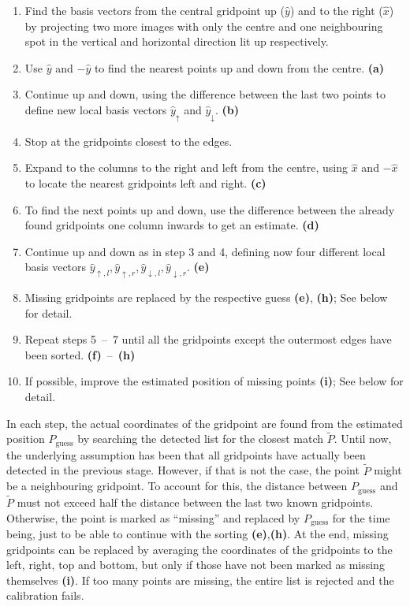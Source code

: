 \begin{enumerate}
    \item Find the basis vectors from the central gridpoint up ($\hat{y}$) and to the right ($\hat{x}$) by projecting two more images with only the centre and one neighbouring spot in the vertical and horizontal direction lit up respectively. 
    \item Use $\hat{y}$ and $-\hat{y}$ to find the nearest points up and down from the centre. \textbf{(a)}
    \item Continue up and down, using the difference between the last two points to define new local basis vectors $\hat{y}_\uparrow$ and $\hat{y}_\downarrow$. \textbf{(b)}
    \item Stop at the gridpoints closest to the edges.
    \item Expand to the columns to the right and left from the centre, using $\hat{x}$ and $-\hat{x}$ to locate the nearest gridpoints left and right. \textbf{(c)}
    \item To find the next points up and down, use the difference between the already found gridpoints one column inwards to get an estimate. \textbf{(d)}
    \item Continue up and down as in step 3 and 4, defining now four different local basis vectors $\hat{y}_{\uparrow,l}, \hat{y}_{\uparrow,r}, \hat{y}_{\downarrow,l}, \hat{y}_{\downarrow,r}$. \textbf{(e)}
    \item Missing gridpoints are replaced by the respective guess \textbf{(e)}, \textbf{(h)}; See below for detail.
    \item Repeat steps 5~--~7 until all the gridpoints except the outermost edges have been sorted. \textbf{(f)}~--~\textbf{(h)}
    \item If possible, improve the estimated position of missing points \textbf{(i)}; See below for detail.
\end{enumerate}
In each step, the actual coordinates of the gridpoint are found from the estimated position $P_\text{guess}$ by searching the detected list for the closest match $\tilde{P}$. Until now, the underlying assumption has been that all gridpoints have actually been detected in the previous stage. However, if that is not the case, the point $\tilde{P}$ might be a neighbouring gridpoint. To account for this, the distance between $P_\text{guess}$ and $\tilde{P}$ must not exceed half the distance between the last two known gridpoints. Otherwise, the point is marked as \enquote{missing} and replaced by $P_\text{guess}$ for the time being, just to be able to continue with the sorting \textbf{(e)},\textbf{(h)}. At the end, missing gridpoints can be replaced by averaging the coordinates of the gridpoints to the left, right, top and bottom, but only if those have not been marked as missing themselves \textbf{(i)}. 
If too many points are missing, the entire list is rejected and the calibration fails.

